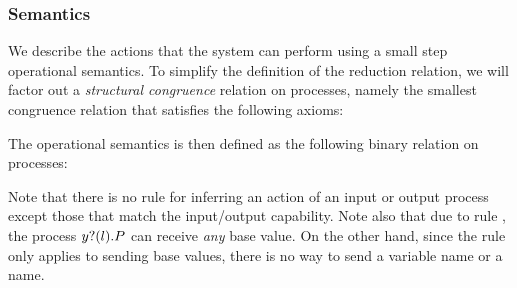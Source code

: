 

\subsubsection{Semantics}
We describe the actions that the system can perform using a small step operational semantics.
To simplify the definition of the reduction relation, we will  factor out a \emph{structural congruence} relation on processes, namely  the smallest congruence relation that satisfies the following axioms:

The operational semantics is then defined as the following binary relation on processes:
Note that there is no rule for inferring an action of an input or output process except those that match the input/output capability.
Note also that due to rule , the process \( y ? (l) . P \) can receive \emph{any} base value.
On the other hand, since the rule  only applies to sending base values, there is no way to send a variable name or a name.

